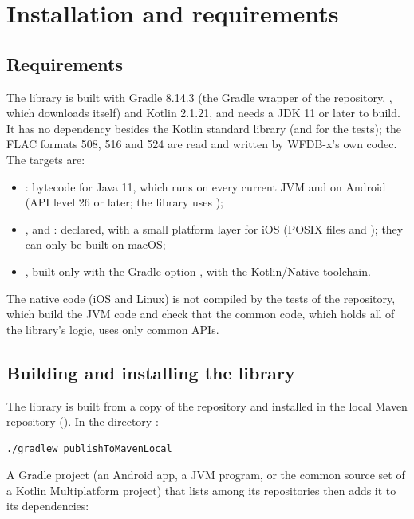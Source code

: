 \section{Installation and requirements}
\label{sec:kotlin-install}

\subsection{Requirements}

The library is built with Gradle 8.14.3 (the Gradle wrapper of the repository,
, which downloads itself) and Kotlin 2.1.21, and needs a JDK 11 or
later to build. It has no dependency besides the Kotlin standard library (and
 for the tests); the FLAC formats 508, 516 and 524 are read and written
by WFDB-x's own codec. The targets are:
\begin{itemize}
\item {}: bytecode for Java 11, which runs on every current JVM and on Android
  (API level 26 or later; the library uses );
\item {},  and : declared, with a
  small platform layer for iOS (POSIX files and ); they can only be
  built on macOS;
\item {}, built only with the Gradle option ,
  with the Kotlin/Native toolchain.
\end{itemize}
The native code (iOS and Linux) is not compiled by the tests of the repository, which
build the JVM code and check that the common code, which holds all of the library's
logic, uses only common APIs.

\subsection{Building and installing the library}

The library is built from a copy of the repository and installed in the local Maven
repository (). In the directory :

\begin{lstlisting}[style=shell]
./gradlew publishToMavenLocal
\end{lstlisting}

A Gradle project (an Android app, a JVM program, or the common source set of a Kotlin
Multiplatform project) that lists  among its repositories then adds it
to its dependencies:


